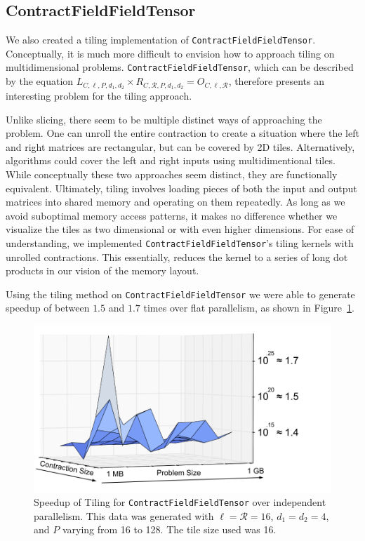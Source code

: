 \subsection{ContractFieldFieldTensor}

We also created a tiling implementation of \texttt{ContractFieldFieldTensor}. Conceptually, it is much more difficult to envision how to approach tiling on multidimensional problems. \texttt{ContractFieldFieldTensor}, which can be described by the equation $L_{C,\ell,P,d_1,d_2} \times R_{C, \mathcal{R}, P,d_1,d_2} = O_{C,\ell, \mathcal{R}}$, therefore presents an interesting problem for the tiling approach. 

Unlike slicing, there seem to be multiple distinct ways of approaching the
problem. One can unroll the entire contraction to create a situation where
the left and right matrices are rectangular, but can be covered by 2D tiles.
Alternatively, algorithms could cover the left and right inputs using
multidimentional tiles. While conceptually these two approaches seem distinct,
they are functionally equivalent. Ultimately, tiling involves loading pieces of
both the input and output matrices into shared memory and operating on them
repeatedly. As long as we avoid suboptimal memory access patterns, it makes no
difference whether we visualize the tiles as two dimensional or with even higher
dimensions. For ease of understanding, we implemented
\texttt{ContractFieldFieldTensor}'s tiling kernels with unrolled
contractions. This essentially, reduces the kernel to a series of long dot
products in our vision of the memory layout. 

Using the tiling method on \texttt{ContractFieldFieldTensor} we were able to generate speedup of between $1.5$ and $1.7$ times over flat parallelism, as shown in Figure~\ref{fig:CFFTSpeedup}. 

\begin{figure}[H]
    \centering
\includegraphics[scale = .4]{ContractFieldFieldTensor}
\caption[\texttt{ContractFieldFieldScalar} Tiling performance]{Speedup of Tiling
    for \texttt{ContractFieldFieldTensor} over independent parallelism. This data was
    generated with $\ell = \mathcal{R} = 16$, $d_1 =
d_2 = 4$, and $P$ varying from 16 to 128. The tile size used was 16.}
\label{fig:CFFTSpeedup}
\end{figure}

